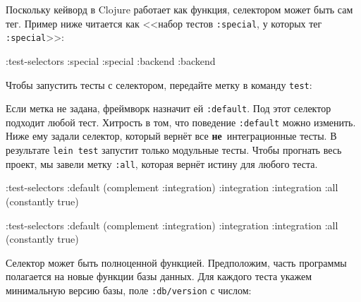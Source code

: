 Поскольку кейворд в Clojure работает как функция, селектором может быть сам
тег. Пример ниже читается как <<набор тестов \verb|:special|, у которых тег
\verb|:special|>>:

\begin{english}
  \begin{clojure}
:test-selectors {:special :special
                 :backend :backend}
  \end{clojure}
\end{english}

\noindent
Чтобы запустить тесты с селектором, передайте метку в команду \verb|test|:

\begin{english}
\end{english}


Если метка не задана, фреймворк назначит ей \verb|:default|. Под этот селектор
подходит любой тест. Хитрость в том, что поведение \verb|:default| можно
изменить. Ниже ему задали селектор, который вернёт все
\textbf{не}~интеграционные тесты. В результате \verb|lein test| запустит только
модульные тесты. Чтобы прогнать весь проект, мы завели метку \verb|:all|,
которая вернёт истину для любого теста.

\ifx\DEVICETYPE\MOBILE

\begin{english}
  \begin{clojure}
:test-selectors
  {:default (complement :integration)
   :integration :integration
   :all (constantly true)}
  \end{clojure}
\end{english}

\else

\begin{english}
  \begin{clojure}
:test-selectors {:default (complement :integration)
                 :integration :integration
                 :all (constantly true)}
  \end{clojure}
\end{english}

\fi

Селектор может быть полноценной функцией. Предположим, часть программы
полагается на новые функции базы данных. Для каждого теста укажем минимальную
версию базы, поле \verb|:db/version| с числом:

